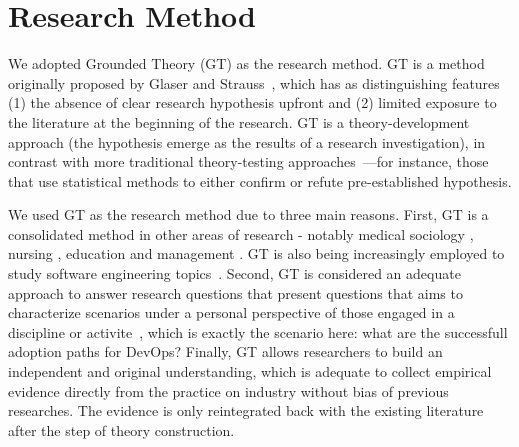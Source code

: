 \section{Research Method} \label{sec:research_method}

We adopted Grounded Theory (GT) as the research method. GT is a method
originally proposed by Glaser and Strauss~\cite{glase1967discovery}, which has
as distinguishing features (1) the absence of clear research hypothesis upfront
and (2) limited exposure to the literature at the beginning of the research. GT
is a theory-development approach (the hypothesis emerge as the results of
a research investigation), in contrast with more traditional
theory-testing approaches~\cite{coleman2007using}---for instance,  those that
use statistical methods to either confirm or refute pre-established hypothesis.


We used GT as the research method due to three main reasons. First, GT is a consolidated
method in other areas of research - notably medical
sociology \cite{gt_medical_sociology}, nursing \cite{gt_nursing}, education
\cite{gt_education} and management \cite{gt_management}. GT is also being increasingly employed
to study software engineering topics~\cite{hoda2017becoming,stol2016grounded,Waterman:2015:ICSE}. Second,
GT is considered an adequate approach to answer research questions that present
questions that aims to characterize scenarios under a personal perspective of those
engaged in a discipline or activite~\cite{barnsteiner2002using},
which is exactly the scenario here: what are the successfull adoption paths for DevOps? Finally,
GT allows researchers to build an independent and original understanding,
which is adequate to collect empirical evidence directly from the
practice on industry without bias of previous researches. The evidence
is only reintegrated back with the existing literature after the step of
theory construction.


